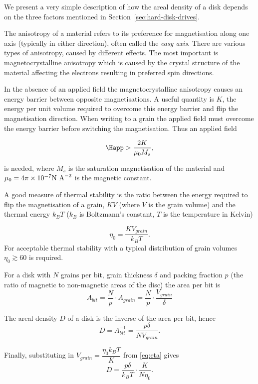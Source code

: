 We present a very simple description of how the areal density of a disk depends on the three factors mentioned in Section~\ref{sec:hard-disk-drives}.

The anisotropy of a material refers to its preference for magnetisation along one axis (typically in either direction), often called the \emph{easy axis}. There are various types of anisotropy, caused by different effects. The most important is magnetocrystalline anisotropy which is caused by the crystal structure of the material affecting the electrons resulting in preferred spin directions.\cite{Getzlaff2008}

In the absence of an applied field the magnetocrystalline anisotropy
causes an energy barrier between opposite magnetisations. A useful
quantity is $K$, the energy per unit volume required to overcome
this energy barrier and flip the magnetisation direction. When writing
to a grain the applied field must overcome the energy barrier before
switching the magnetisation. Thus an applied field

\begin{equation}
\Happ > \dfrac{2K}{\mu_{0}M_s},
\label{eq:43}
\end{equation}

is needed, where $M_s$ is the saturation magnetisation of the material and $\mu_0 = 4 \pi \times 10^{-7} \text{N A}^{-2}$ is the magnetic constant.\cite{McDaniel2005}

A good measure of thermal stability is the ratio between the energy required to
flip the magnetisation of a grain, $KV$ (where $V$ is the grain volume) and the
thermal energy $k_{B}T$ ($k_{B}$ is Boltzmann's constant, $T$ is the temperature
in Kelvin)

\begin{equation}
  \eta_{0}=\dfrac{KV_{grain}}{k_{B}T}.\label{eq:eta}
\end{equation}
For acceptable thermal stability with a typical distribution of grain
volumes $\eta_0 \gtrsim 60$ is required.\cite{McDaniel2005}

For a disk with $N$ grains per bit, grain thickness $\delta$ and packing
fraction $p$ (the ratio of magnetic to non-magnetic areas of the
disc) the area per bit is
\[
A_{bit}=\dfrac{N}{p}\cdot A_{grain}=\dfrac{N}{p}\cdot\dfrac{V_{grain}}{\delta}
\]

The areal density $D$ of a disk is the inverse of the area per bit,
hence
\[
D=A_{bit}^{-1}=\dfrac{p\delta}{NV_{grain}}.
\]

Finally, substituting in $V_{grain}=\dfrac{\eta_{0}k_{B}T}{K}$ from \eqref{eq:eta} gives
\begin{equation}
D=\dfrac{p\delta}{k_{B}T}\cdot\dfrac{K}{N\eta_{0}}.\label{eq:AD}
\end{equation}


